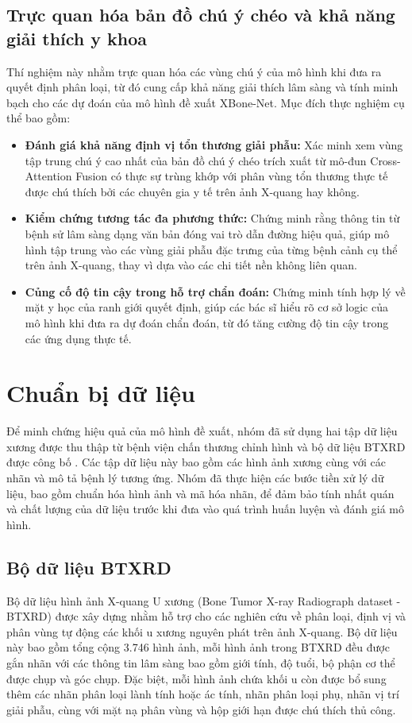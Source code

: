 \subsection{Trực quan hóa bản đồ chú ý chéo và khả năng giải thích y khoa}
Thí nghiệm này nhằm trực quan hóa các vùng chú ý của mô hình khi đưa ra quyết định phân loại, từ đó cung cấp khả năng giải thích lâm sàng và tính minh bạch cho các dự đoán của mô hình đề xuất XBone-Net. Mục đích thực nghiệm cụ thể bao gồm:
\begin{itemize}
    \item \textbf{Đánh giá khả năng định vị tổn thương giải phẫu:} Xác minh xem vùng tập trung chú ý cao nhất của bản đồ chú ý chéo trích xuất từ mô-đun Cross-Attention Fusion có thực sự trùng khớp với phân vùng tổn thương thực tế được chú thích bởi các chuyên gia y tế trên ảnh X-quang hay không.
    \item \textbf{Kiểm chứng tương tác đa phương thức:} Chứng minh rằng thông tin từ bệnh sử lâm sàng dạng văn bản đóng vai trò dẫn đường hiệu quả, giúp mô hình tập trung vào các vùng giải phẫu đặc trưng của từng bệnh cảnh cụ thể trên ảnh X-quang, thay vì dựa vào các chi tiết nền không liên quan.
    \item \textbf{Củng cố độ tin cậy trong hỗ trợ chẩn đoán:} Chứng minh tính hợp lý về mặt y học của ranh giới quyết định, giúp các bác sĩ hiểu rõ cơ sở logic của mô hình khi đưa ra dự đoán chẩn đoán, từ đó tăng cường độ tin cậy trong các ứng dụng thực tế.
\end{itemize}

\section{Chuẩn bị dữ liệu}
Để minh chứng hiệu quả của mô hình đề xuất, nhóm đã sử dụng hai tập dữ liệu xương được thu thập từ bệnh viện chấn thương chỉnh hình và bộ dữ liệu BTXRD được công bố \cite{Yao2025}. Các tập dữ liệu này bao gồm các hình ảnh xương cùng với các nhãn và mô tả bệnh lý tương ứng. Nhóm đã thực hiện các bước tiền xử lý dữ liệu, bao gồm chuẩn hóa hình ảnh và mã hóa nhãn, để đảm bảo tính nhất quán và chất lượng của dữ liệu trước khi đưa vào quá trình huấn luyện và đánh giá mô hình.

\subsection{Bộ dữ liệu BTXRD}
Bộ dữ liệu hình ảnh X-quang U xương (Bone Tumor X-ray Radiograph dataset - BTXRD) được xây dựng nhằm hỗ trợ cho các nghiên cứu về phân loại, định vị và phân vùng tự động các khối u xương nguyên phát trên ảnh X-quang. Bộ dữ liệu này bao gồm tổng cộng 3.746 hình ảnh, mỗi hình ảnh trong BTXRD đều được gắn nhãn với các thông tin lâm sàng bao gồm giới tính, độ tuổi, bộ phận cơ thể được chụp và góc chụp. Đặc biệt, mỗi hình ảnh chứa khối u còn được bổ sung thêm các nhãn phân loại lành tính hoặc ác tính, nhãn phân loại phụ, nhãn vị trí giải phẫu, cùng với mặt nạ phân vùng và hộp giới hạn được chú thích thủ công.

